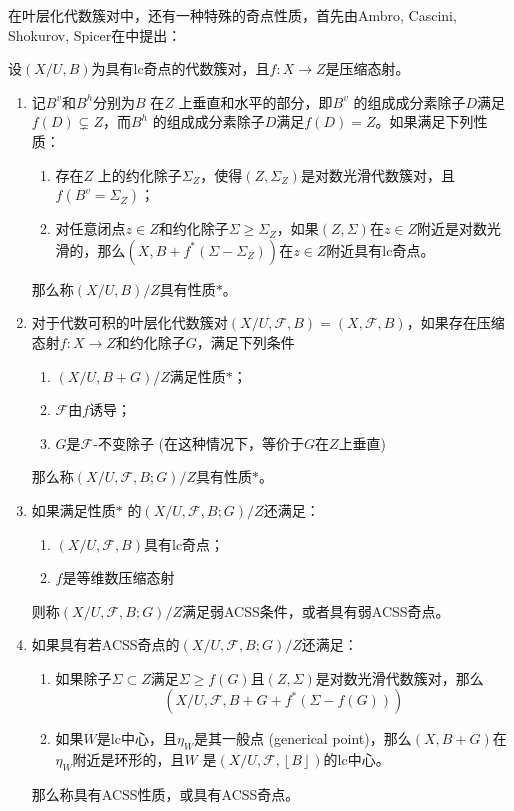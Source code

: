 在叶层化代数簇对中，还有一种特殊的奇点性质，首先由Ambro, Cascini, Shokurov, Spicer在\cite{acss}中提出：
\begin{definition}[ACSS奇点]\cite[Definition 4.1-3]{acc_foliation}
 设$ (X/U,B) $为具有lc奇点的代数簇对，且$f: X\to Z$是压缩态射。
\begin{enumerate}
  \item 记$B^{v}$和$ B^{h}$分别为$B$ 在$Z$ 上垂直和水平的部分，即$B^{v}$ 的组成成分素除子$D$满足$f(D)\subsetneq Z $，而$B^{h}$  的组成成分素除子$D$满足$f(D)= Z$。如果满足下列性质：
        \begin{enumerate}
          \item 存在$Z$ 上的约化除子$\Sigma_{Z}$，使得$(Z,\Sigma_{Z}) $是对数光滑代数簇对，且$f(B^{v}=\Sigma_{Z})$；
          \item 对任意闭点$z \in Z$和约化除子$\Sigma \geqslant \Sigma_{Z}$，如果$(Z,\Sigma)$在$z \in Z$附近是对数光滑的，那么$(X,B+f^{*}(\Sigma-\Sigma_{Z}))$在$z \in Z$附近具有lc奇点。 
        \end{enumerate}
        那么称$(X/U,B)/Z$具有性质$*$。
  \item 对于代数可积的叶层化代数簇对$(X/U,\mathcal{F},B)=(X,\mathcal{F},B)$，如果存在压缩态射$f:X \to Z$和约化除子$G$，满足下列条件
        \begin{enumerate}
          \item $(X/U,B+G)/Z$满足性质$*$；
          \item $\mathcal{F}$由$ f$诱导；
          \item $G$是$\mathcal{F}$-不变除子 (在这种情况下，等价于$G$在$Z$上垂直)
        \end{enumerate}
      那么称$(X/U,\mathcal{F},B;G)/Z$具有性质$*$。
    \item 如果满足性质$*$ 的$(X/U,\mathcal{F},B;G)/Z$还满足：
          \begin{enumerate}
            \item $(X/U,\mathcal{F},B)$具有lc奇点；
            \item $f$是等维数压缩态射
          \end{enumerate}
          则称$(X/U,\mathcal{F},B;G)/Z$满足弱ACSS条件，或者具有弱ACSS奇点。
    \item 如果具有若ACSS奇点的$(X/U,\mathcal{F},B;G)/Z$还满足：
          \begin{enumerate}
            \item 如果除子$\Sigma \subset Z$满足$\Sigma \geqslant f(G)$且$(Z,\Sigma)$是对数光滑代数簇对，那么
              \[ (X/U,\mathcal{F},B+G+f^{*}(\Sigma - f(G ))) \]
            \item 如果$W$是lc中心，且$ \eta_{W}$是其一般点 (generical point)，那么$(X,B+G)$在$\eta_{W}$附近是环形的，且$W$ 是$(X/U,\mathcal{F},\left\lfloor B \right\rfloor )$的lc中心。
          \end{enumerate}
          那么称具有ACSS性质，或具有ACSS奇点。
\end{enumerate}
\end{definition}
